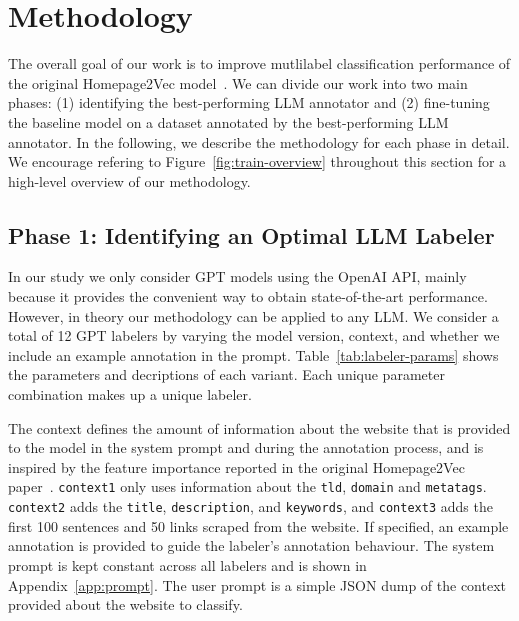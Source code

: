 \section{Methodology}\label{sec:methodology}

The overall goal of our work is to improve mutlilabel classification performance of the original Homepage2Vec model~\cite{homepage2vec}. We can divide our work into two main phases: (1) identifying the best-performing LLM annotator and (2) fine-tuning the baseline model on a dataset annotated by the best-performing LLM annotator. In the following, we describe the methodology for each phase in detail. We encourage refering to Figure~\ref{fig:train-overview} throughout this section for a high-level overview of our methodology.

\subsection{Phase 1: Identifying an Optimal LLM Labeler}



In our study we only consider GPT models using the OpenAI API, mainly because it provides the convenient way to obtain state-of-the-art performance. However, in theory our methodology can be applied to any LLM. We consider a total of 12 GPT labelers by varying the model version, context, and whether we include an example annotation in the prompt. Table~\ref{tab:labeler-params} shows the parameters and decriptions of each variant. Each unique parameter combination makes up a unique labeler.

The context defines the amount of information about the website that is provided to the model in the system prompt and during the annotation process, and is inspired by the feature importance reported in the original Homepage2Vec paper~\cite{homepage2vec}. \texttt{context1} only uses information about the \texttt{tld}, \texttt{domain} and \texttt{metatags}. \texttt{context2} adds the \texttt{title}, \texttt{description}, and \texttt{keywords}, and \texttt{context3} adds the first 100 sentences and 50 links scraped from the website. If specified, an example annotation is provided to guide the labeler's annotation behaviour. The system prompt is kept constant across all labelers and is shown in Appendix~\ref{app:prompt}. The user prompt is a simple JSON dump of the context provided about the website to classify.

